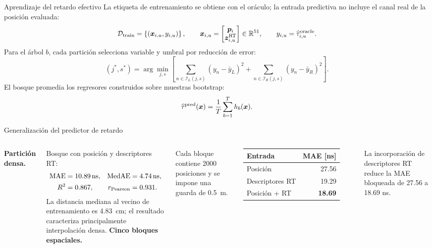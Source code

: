 \documentclass[10pt,aspectratio=169]{beamer}
\newcommand{\vect}[1]{\bm{#1}}
\begin{document}
\begin{frame}{Aprendizaje del retardo efectivo}
\small
La etiqueta de entrenamiento se obtiene con el oráculo; la entrada predictiva no
incluye el canal real de la posición evaluada:
\begin{equation*}
\mathcal D_{\rm train}=
\left\{\left(\vect x_{i,u},y_{i,u}\right)\right\},
\qquad
\vect x_{i,u}=\begin{bmatrix}\vect p_i\\\vect z^{\rm RT}_{i,u}\end{bmatrix}
\in\mathbb R^{51},
\qquad
y_{i,u}=\widehat\tau^{\rm oracle}_{i,u}.
\end{equation*}
Para el árbol $b$, cada partición selecciona variable y umbral por reducción de error:
\begin{equation*}
(j^*,s^*)=\arg\min_{j,s}
\left[
\sum_{n\in\mathcal I_L(j,s)}(y_n-\bar y_L)^2+
\sum_{n\in\mathcal I_R(j,s)}(y_n-\bar y_R)^2
\right].
\end{equation*}
El bosque promedia los regresores construidos sobre muestras bootstrap:
\begin{equation*}
\widehat\tau^{\rm pred}(\vect x)=\frac1T\sum_{b=1}^{T}h_b(\vect x).
\end{equation*}
\end{frame}

\begin{frame}{Generalización del predictor de retardo}
\scriptsize
\begin{columns}[T]
\textbf{Partición densa.}\par\vspace{0.1cm}
Bosque con posición y descriptores RT:
\begin{align*}
\mathrm{MAE}&=\SI{10.89}{ns},&
\mathrm{MedAE}&=\SI{4.74}{ns},\\
R^2&=0.867,&
r_{\rm Pearson}&=0.931.
\end{align*}
La distancia mediana al vecino de entrenamiento es \SI{4.83}{cm}; el resultado
caracteriza principalmente interpolación densa.
\textbf{Cinco bloques espaciales.}\par\vspace{0.1cm}
Cada bloque contiene 2000 posiciones y se impone una guarda de \SI{0.5}{m}.
\begin{table}
\centering
\begin{tabular}{lr}
\toprule
Entrada & MAE [ns]\\
\midrule
Posición & 27.56\\
Descriptores RT & 19.29\\
Posición + RT & \textbf{18.69}\\
\bottomrule
\end{tabular}
\end{table}
La incorporación de descriptores RT reduce la MAE bloqueada de 27.56 a 18.69 ns.
\end{columns}
\end{frame}
\end{document}
